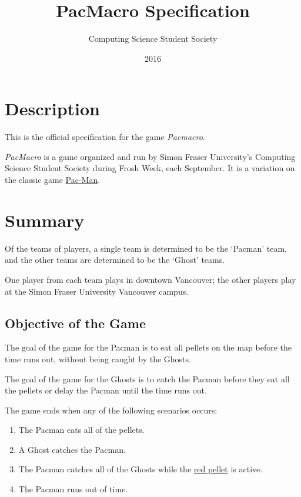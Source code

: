 \documentclass[10pt, oneside, letterpaper, titlepage]{article}
\title{PacMacro Specification}
\author{Computing Science Student Society}
\date{2016}
\begin{document}
	\maketitle
	\clearpage
	\tableofcontents
	\clearpage

	\section{Description}
	\label{sec:description}

	This is the official specification for the game \emph{Pacmacro}.

	\emph{PacMacro} is a game organized and run by Simon Fraser University's Computing Science Student Society during Frosh Week, each September. It is a variation on the classic game \href{https://en.wikipedia.org/wiki/Pac-Man}{Pac-Man}.

	\section{Summary}
	\label{sec:summary}

	Of the teams of players, a single team is determined to be the `Pacman' team, and the other teams are determined to be the `Ghost' teams.

	One player from each team plays in downtown Vancouver; the other players play at the Simon Fraser University Vancouver campus.

	\subsection{Objective of the Game}
	\label{subsec:summary:objective-of-the-game}

	The goal of the game for the Pacman is to eat all pellets on the map before the time runs out, without being caught by the Ghosts.

	The goal of the game for the Ghosts is to catch the Pacman before they eat all the pellets or delay the Pacman until the time runs out.

	The game ends when any of the following scenarios occurs:
	\begin{enumerate}
		\item The Pacman eats all of the pellets.
		\item A Ghost catches the Pacman.
		\item The Pacman catches all of the Ghosts while the \hyperref[subsec:gameplay:formal-rules]{red pellet} is active.
		\item The Pacman runs out of time.
	\end{enumerate}
\end{document}
